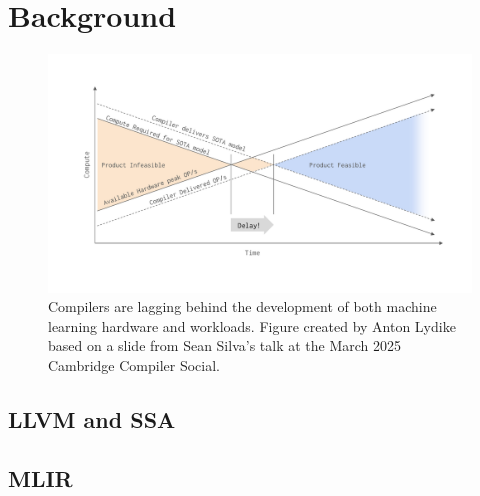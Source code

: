\chapter{Background}
\label{chap:background}

%


\begin{figure}[H]
    \centering
    \includegraphics[width=\textwidth]{images/11_introduction/compilers_lagging.pdf}
    \caption{Compilers are lagging behind the development of both machine learning hardware and workloads. Figure created by Anton Lydike based on a slide from Sean Silva's talk at the March 2025 Cambridge Compiler Social.}
    \label{fig:compilers-lagging}
\end{figure}


\section{LLVM and SSA}
\label{sec:llvm-ssa}

\section{MLIR}
\label{sec:mlir}

